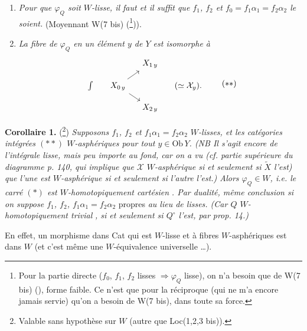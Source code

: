 \begin{enumerate}
\item[\textit{a)}] \textit{Pour que $\varphi_Q$ soit $W$-lisse, il faut et il suffit que $f_1$, $f_2$ et $f_0 = f_1\alpha_1 = f_2\alpha_2$ le soient.} (Moyennant W(7 bis) (\footnote{Pour la partie directe ($f_0$, $f_1$, $f_2$ lisses $\Longrightarrow \varphi_Q$ lisse), on n'a besoin que de W(7 bis) (\footnotemark), forme faible. Ce n'est que pour la réciproque (qui ne m'a encore jamais servie) qu'on a besoin de W(7 bis), dans toute sa force.})).

\item[\textit{b)}] \textit{La fibre de $\varphi_Q$ en un élément $y$ de $Y$ est isomorphe à}
\[
\begin{tikzcd}[row sep=small, column sep=small]
 & & X_{1\,y} & \\
\int &[-1.2em] X_{0\,y} \arrow[ur] \arrow[dr] & &[2em] (\simeq \mathcal{X}_y). \\
 & & X_{2\,y} &
\end{tikzcd}
\tag*{$(**)$}
\]
\end{enumerate}

\textbf{Corollaire 1.} (\footnote{Valable sans hypothèse sur $W$ (autre que Loc(1,2,3 bis)).}) \textit{Supposons $f_1$, $f_2$ et $f_1\alpha_1 = f_2\alpha_2$ $W$-lisses, et les catégories intégrées $(**)$ $W$-asphériques pour tout $y \in \mathrm{Ob}\,Y$. (NB Il s'agit encore de l'intégrale lisse, mais peu importe au fond, car on a vu (cf. partie supérieure du diagramme p. 140, qui implique que $\mathcal{X}$} \textit{$W$-asphérique si et seulement si $\tilde{X}$ l'est) que l'une est $W$-asphérique si et seulement si l'autre l'est.) Alors $\varphi_Q \in W$, i.e. le carré $(*)$ est $W$-homotopiquement cartésien} \textit{. Par dualité, même conclusion si on suppose $f_1$, $f_2$, $f_1\alpha_1 = f_2\alpha_2$} propres \textit{au lieu de lisses. (Car $Q$ $W$-homotopiquement trivial} \textit{, si et seulement si $Q^\circ$ l'est, par} \textit{prop. 14.)}

En effet, un morphisme dans Cat qui est $W$-lisse et à fibres $W$-asphériques est dans $W$ (et c'est même une $W$-équivalence universelle \dots).

